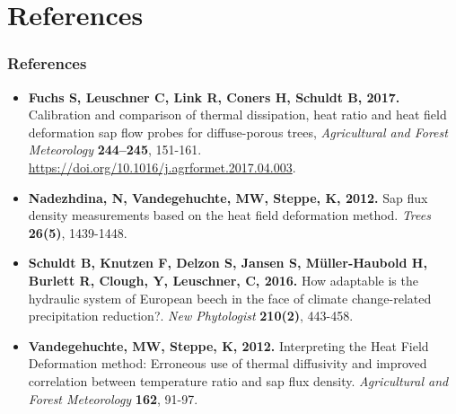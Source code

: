 \documentclass[usepdftitle=false]{beamer}
\newenvironment{changemargin}[2]{%
	\begin{list}{}{%
			\setlength{\topsep}{0pt}%
			\setlength{\leftmargin}{#1}%
			\setlength{\rightmargin}{#2}%
			\setlength{\listparindent}{\parindent}%
			\setlength{\itemindent}{\parindent}%
			\setlength{\parsep}{\parskip}%
		}%
		\item[]}
	{\end{list}
}
\begin{document}
\section{References}
\begin{frame}[t]
	\frametitle{References}
	\begin{changemargin}{-2em}{-2em}
		\footnotesize
		\begin{itemize}
			\item \textbf{Fuchs S, Leuschner C, Link R, Coners H, Schuldt B, 2017.}
			Calibration and comparison of thermal dissipation, heat ratio and heat field deformation sap flow probes for diffuse-porous trees,
			\textit{Agricultural and Forest Meteorology} \textbf{244–245}, 151-161. \url{https://doi.org/10.1016/j.agrformet.2017.04.003}.
			\item \textbf{Nadezhdina, N, Vandegehuchte, MW, Steppe, K, 2012.} Sap flux density measurements based on the heat field deformation method. \textit{Trees} \textbf{26(5)}, 1439-1448.
			\item \textbf{Schuldt B, Knutzen F, Delzon S, Jansen S, Müller-Haubold H, Burlett R, Clough, Y, Leuschner, C, 2016.} How adaptable is the hydraulic system of European beech in the face of climate change-related precipitation reduction?. \textit{New Phytologist} \textbf{210(2)}, 443-458.
			\item \textbf{Vandegehuchte, MW,  Steppe, K, 2012.} Interpreting the Heat Field Deformation method: Erroneous use of thermal diffusivity and improved correlation between temperature ratio and sap flux density. \textit{Agricultural and Forest Meteorology} \textbf{162}, 91-97.
		\end{itemize}
	\end{changemargin}
\end{frame}
\end{document}
